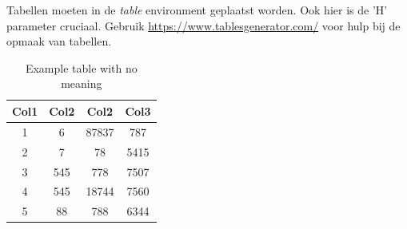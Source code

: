 Tabellen moeten in de \textit{table} environment geplaatst worden.
Ook hier is de 'H' parameter cruciaal.
Gebruik \url{https://www.tablesgenerator.com/} voor hulp bij de opmaak van tabellen.
\begin{table}[H]
\centering
    \label{tab:example_table}
    \caption{Example table with no meaning}
    \begin{tabular}{||c c c c||} 
    \hline
    Col1 & Col2 & Col2 & Col3 \\ [0.5ex] 
    \hline\hline
    1 & 6 & 87837 & 787 \\ 
    2 & 7 & 78 & 5415 \\
    3 & 545 & 778 & 7507 \\
    4 & 545 & 18744 & 7560 \\
    5 & 88 & 788 & 6344 \\ [1ex] 
    \hline
    \end{tabular}
\end{table}